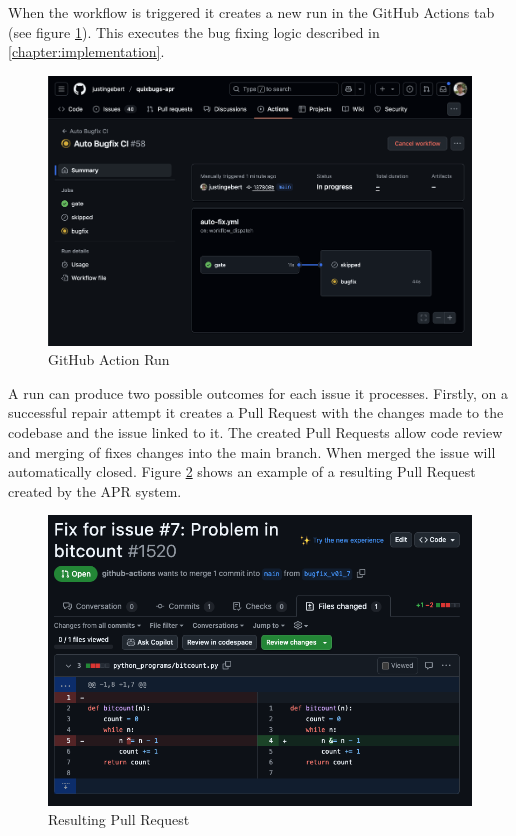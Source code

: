 When the workflow is triggered it creates a new run in the GitHub Actions tab (see figure \ref{fig:apr-action}). This executes the bug fixing logic described in \ref{chapter:implementation}.

\begin{figure}[H]
    \centering
    \includegraphics[width=1\textwidth]{images/workflow/new_action.png}
    \caption{GitHub Action Run}
    \label{fig:apr-action}
\end{figure}

A run can produce two possible outcomes for each issue it processes. Firstly, on a successful repair attempt it creates a Pull Request with the changes made to the codebase and the issue linked to it. The created Pull Requests allow code review and merging of fixes changes into the main branch. When merged the issue will automatically closed. Figure \ref{fig:pr} shows an example of a resulting Pull Request created by the APR system.

\begin{figure}[H]
    \centering
    \includegraphics[width=1\textwidth]{images/workflow/pr.png}
    \caption{Resulting Pull Request}
    \label{fig:pr}
\end{figure}

